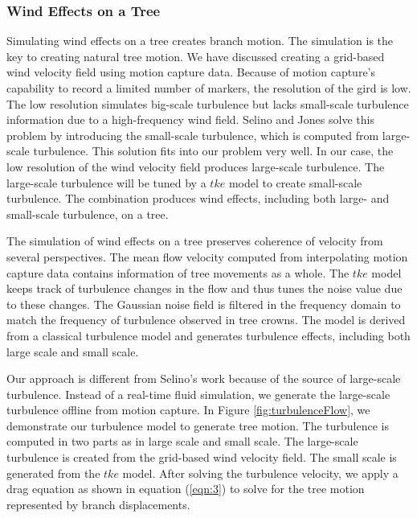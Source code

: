 \subsubsection{Wind Effects on a Tree}
Simulating wind effects on a tree creates branch motion. The simulation is the key to creating natural tree motion. We have discussed creating a grid-based wind velocity field using motion capture data. Because of motion capture's capability to record a limited number of markers, the resolution of the gird is low. The low resolution simulates big-scale turbulence but lacks small-scale turbulence information due to a high-frequency wind field. Selino and Jones \cite{Selino:2012} solve this problem by introducing the small-scale turbulence, which is computed from large-scale turbulence. This solution fits into our problem very well. In our case, the low resolution of the wind velocity field produces large-scale turbulence. The large-scale turbulence will be tuned by a $tke$ model to create small-scale turbulence. The combination produces wind effects, including both large- and small-scale turbulence, on a tree.

The simulation of wind effects on a tree preserves coherence of velocity from several perspectives. The mean flow velocity computed from interpolating motion capture data contains information of tree movements as a whole. The $tke$ model keeps track of turbulence changes in the flow and thus tunes the noise value due to these changes. The Gaussian noise field is filtered in the frequency domain to match the frequency of turbulence observed in tree crowns. The model is derived from a classical turbulence model and generates turbulence effects, including both large scale and small scale.

Our approach is different from Selino's work because of the source of large-scale turbulence. Instead of a real-time fluid simulation, we generate the large-scale turbulence offline from motion capture. In Figure \ref{fig:turbulenceFlow}, we demonstrate our turbulence model to generate tree motion. The turbulence is computed in two parts as in large scale and small scale. The large-scale turbulence is created from the grid-based wind velocity field. The small scale is generated from the $tke$ model. After solving the turbulence velocity, we apply a drag equation as shown in equation (\ref{eqn:3}) to solve for the tree motion represented by branch displacements. 

